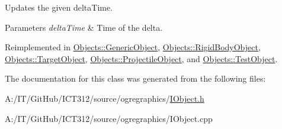 Updates the given delta\-Time. 


\begin{DoxyParams}{Parameters}
{\em delta\-Time} & Time of the delta. \\
\hline
\end{DoxyParams}


Reimplemented in \hyperlink{class_objects_1_1_generic_object_a57c85bdf2ceb1ffa1b85ec3aa51a631d}{Objects\-::\-Generic\-Object}, \hyperlink{class_objects_1_1_rigid_body_object_a478edcbc5820722a9641fdcd07b402bb}{Objects\-::\-Rigid\-Body\-Object}, \hyperlink{class_objects_1_1_target_object_a46b8163c5921925aa6d95fc0e99ce011}{Objects\-::\-Target\-Object}, \hyperlink{class_objects_1_1_projectile_object_ae8cb3b7f7a9f5b921b043a58e9e355dc}{Objects\-::\-Projectile\-Object}, and \hyperlink{class_objects_1_1_test_object_a5df5df31f7f1233cd991d200ecac7205}{Objects\-::\-Test\-Object}.



The documentation for this class was generated from the following files\-:\begin{DoxyCompactItemize}
\item 
A\-:/\-I\-T/\-Git\-Hub/\-I\-C\-T312/source/ogregraphics/\hyperlink{_i_object_8h}{I\-Object.\-h}\item 
A\-:/\-I\-T/\-Git\-Hub/\-I\-C\-T312/source/ogregraphics/I\-Object.\-cpp\end{DoxyCompactItemize}
